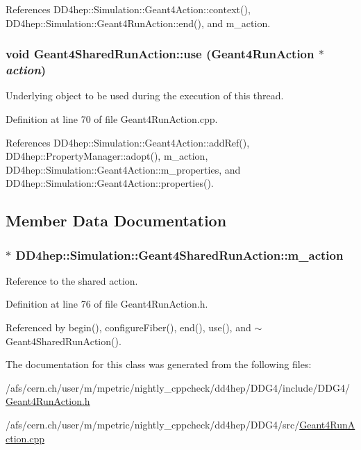References DD4hep::Simulation::Geant4Action::context(), DD4hep::Simulation::Geant4RunAction::end(), and m\_\-action.\hypertarget{class_d_d4hep_1_1_simulation_1_1_geant4_shared_run_action_ae0502a99bbdefd87e3b32e5046294585}{
\subsubsection[{use}]{\setlength{\rightskip}{0pt plus 5cm}void Geant4SharedRunAction::use ({\bf Geant4RunAction} $\ast$ {\em action})}}
\label{class_d_d4hep_1_1_simulation_1_1_geant4_shared_run_action_ae0502a99bbdefd87e3b32e5046294585}


Underlying object to be used during the execution of this thread. 

Definition at line 70 of file Geant4RunAction.cpp.

References DD4hep::Simulation::Geant4Action::addRef(), DD4hep::PropertyManager::adopt(), m\_\-action, DD4hep::Simulation::Geant4Action::m\_\-properties, and DD4hep::Simulation::Geant4Action::properties().

\subsection{Member Data Documentation}
\hypertarget{class_d_d4hep_1_1_simulation_1_1_geant4_shared_run_action_a2d197cf997162e46c7dc5aa51c46a6c7}{
\subsubsection[{m\_\-action}]{$\ast$ {\bf DD4hep::Simulation::Geant4SharedRunAction::m\_\-action}}}
\label{class_d_d4hep_1_1_simulation_1_1_geant4_shared_run_action_a2d197cf997162e46c7dc5aa51c46a6c7}


Reference to the shared action. 

Definition at line 76 of file Geant4RunAction.h.

Referenced by begin(), configureFiber(), end(), use(), and $\sim$Geant4SharedRunAction().

The documentation for this class was generated from the following files:\begin{DoxyCompactItemize}
\item 
/afs/cern.ch/user/m/mpetric/nightly\_\-cppcheck/dd4hep/DDG4/include/DDG4/\hyperlink{_geant4_run_action_8h}{Geant4RunAction.h}\item 
/afs/cern.ch/user/m/mpetric/nightly\_\-cppcheck/dd4hep/DDG4/src/\hyperlink{_geant4_run_action_8cpp}{Geant4RunAction.cpp}\end{DoxyCompactItemize}
